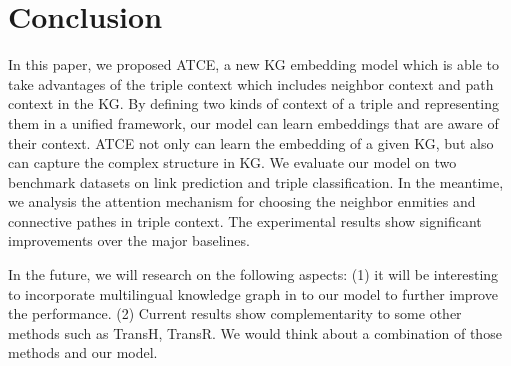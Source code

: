 \section{Conclusion}\label{sec:con}
In this paper, we proposed ATCE, a new KG embedding model which is able to take advantages of the triple context which includes neighbor context and path context in the KG. By defining two kinds of context of a triple and representing them in a unified framework, our model can learn embeddings that are aware of their context. ATCE not only can learn the embedding of a given KG, but also can capture the complex structure in KG. We evaluate our model on two benchmark datasets on link prediction and triple classification. In the meantime, we analysis the attention mechanism for choosing the neighbor enmities and connective pathes in triple context. The experimental results show significant improvements over the major baselines.

In the future, we will research on the following aspects: (1) it will be interesting to incorporate multilingual knowledge graph in to our model to further improve the performance. (2) Current results show complementarity to some other methods such as TransH, TransR. We would think about a combination of those methods and our model. 

